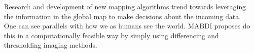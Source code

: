 Research and development of new mapping algorithms trend towards
leveraging the information in the global map to make decisions about the
incoming data. One can see parallels with how we as humans see the world. MABDI
proposes do this in a computationally feasible way by simply using
differencing and thresholding imaging methods.
